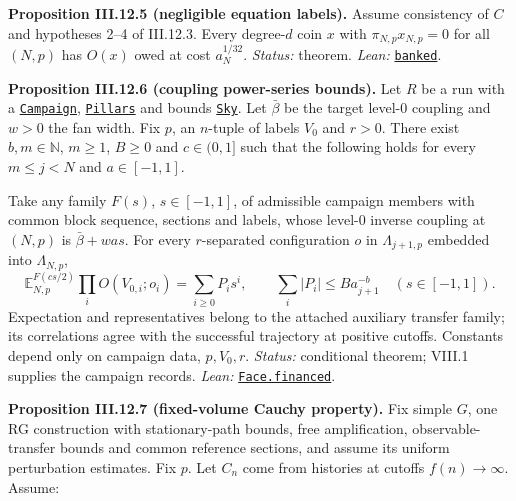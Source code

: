 \documentclass[
  letterpaper,
  11pt]{article}
\begin{document}
\textbf{Proposition III.12.5 (negligible equation labels).} Assume
consistency of \(C\) and hypotheses 2--4 of III.12.3. Every degree-\(d\)
coin \(x\) with \(\pi_{N,p}x_{N,p}=0\) for all \((N,p)\) has \(O(x)\)
owed at cost \(a_N^{1/32}\). \emph{Status:} theorem. \emph{Lean:}
\href{https://github.com/yang-mills-group/OpenAI-YM-20261028/blob/3456e5e75cf8d4cd558955a5c7638fba2d68f464/YM/FullVolume/Silent.lean\#L105-L115}{\texttt{banked}}.

\textbf{Proposition III.12.6 (coupling power-series bounds).} Let \(R\)
be a run with a
\href{https://github.com/yang-mills-group/OpenAI-YM-20261028/blob/3456e5e75cf8d4cd558955a5c7638fba2d68f464/YM/FullVolume/Stage/Crests.lean\#L20-L27}{\texttt{Campaign}},
\href{https://github.com/yang-mills-group/OpenAI-YM-20261028/blob/3456e5e75cf8d4cd558955a5c7638fba2d68f464/YM/FullVolume/Gables/Vendee.lean\#L22-L27}{\texttt{Pillars}}
and bounds
\href{https://github.com/yang-mills-group/OpenAI-YM-20261028/blob/3456e5e75cf8d4cd558955a5c7638fba2d68f464/YM/FullVolume/Fares/Oz.lean\#L22-L28}{\texttt{Sky}}.
Let \(\bar\beta\) be the target level-0 coupling and \(w>0\) the fan
width. Fix \(p\), an \(n\)-tuple of labels \(V_0\) and \(r>0\). There
exist \(b,m\in\mathbb N\), \(m\ge1\), \(B\ge0\) and \(c\in(0,1]\) such
that the following holds for every \(m\le j<N\) and \(a\in[-1,1]\).

Take any family \(F(s)\), \(s\in[-1,1]\), of admissible campaign members
with common block sequence, sections and labels, whose level-0 inverse
coupling at \((N,p)\) is \(\bar\beta+was\). For every \(r\)-separated
configuration \(o\) in \(\Lambda_{j+1,p}\) embedded into
\(\Lambda_{N,p}\),
\[\mathbb E^{F(cs/2)}_{N,p}\prod_iO(V_{0,i};o_i)=\sum_{i\ge0}P_is^i,\qquad \sum_i|P_i|\le B a_{j+1}^{-b}\quad(s\in[-1,1]).\]
Expectation and representatives belong to the attached auxiliary
transfer family; its correlations agree with the successful trajectory
at positive cutoffs. Constants depend only on campaign data,
\(p,V_0,r\). \emph{Status:} conditional theorem; VIII.1 supplies the
campaign records. \emph{Lean:}
\href{https://github.com/yang-mills-group/OpenAI-YM-20261028/blob/3456e5e75cf8d4cd558955a5c7638fba2d68f464/YM/FullVolume/Fares/Scrap.lean\#L40-L51}{\texttt{Face.financed}}.

\textbf{Proposition III.12.7 (fixed-volume Cauchy property).} Fix simple
\(G\), one RG construction with stationary-path bounds, free
amplification, observable-transfer bounds and common reference sections,
and assume its uniform perturbation estimates. Fix \(p\). Let \(C_n\)
come from histories at cutoffs \(f(n)\to\infty\). Assume:
\end{document}
